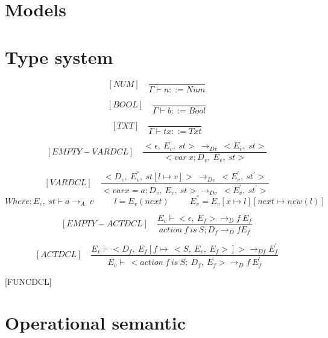   
  \section{Models}
  
  \section{Type system}
  
	\[
	[NUM] \quad
	\dfrac{}{\Gamma \vdash n ::= Num}
	\]
	 
	\[
	[BOOL] \quad
	\dfrac{}{\Gamma \vdash b ::= Bool}
	\]
	
  	\[
  	[TXT] \quad
  	\dfrac{}{\Gamma \vdash tx ::= Txt}
  	\]
  
	\[
  	[EMPTY-VARDCL] \quad
  	\dfrac{<\epsilon, \ E_v, \ st> \ \rightarrow_{Dv} \ <E_v, \ st> }{<var \ x; D_v,\ E_v,\ st>}
  	\]
  	
  	\[
  	[VARDCL] \quad
  	\dfrac{<D_v, \ E_v^{''}, \ st[l \mapsto v]> \ \rightarrow_{Dv} \ <E_v^{'}, \ st^{'}> }{<var x = a; D_v,\ E_v,\ st> \rightarrow_{Dv} \ <E_v^{'}, \ st^{'}>}
  	\]
  	\begin{math}
	  	Where: E_v, \ st \vdash a \rightarrow_A \ v
	  	\qquad \ \ l = E_v(next)
	  	\qquad \ \ E_v^{''} = E_v[x \mapsto l][next \mapsto new(l)]
  	\end{math}
  	
  	\[
  	[EMPTY-ACTDCL] \quad
  	\dfrac{E_v \vdash <\epsilon, \ E_f> \rightarrow_Df \ E_f}{ action \ f \ is \ S; D_f \rightarrow_Df E_f }
  	\]
  	
  	
	\[
  	[ACTDCL] \quad
  	\dfrac{E_v \vdash <D_f, \ E_f[f \mapsto \ <S, \ E_v, \ E_f>]> \rightarrow_{Df} E^{'}_f}{E_v \vdash \ <action \ f \ is \ S; \ D_f, \ E_f> \rightarrow_Df \ E_f^{'}}
  	\]
  

  	


    [FUNCDCL]

  
  \section{Operational semantic}